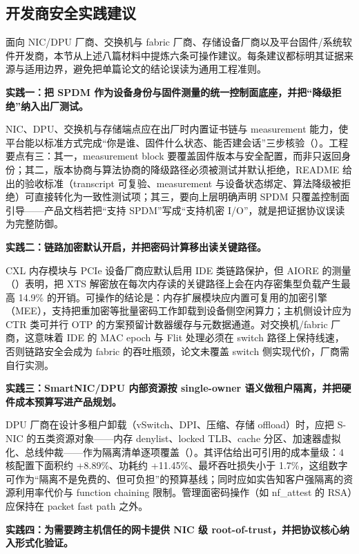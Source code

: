 \documentclass[11pt]{ctexart}
\begin{document}
\subsection{开发商安全实践建议}
面向 NIC/DPU 厂商、交换机与 fabric 厂商、存储设备厂商以及平台固件/系统软件开发商，本节从上述八篇材料中提炼六条可操作建议。每条建议都标明其证据来源与适用边界，避免把单篇论文的结论误读为通用工程准则。\par
\noindent\textbf{实践一：把 SPDM 作为设备身份与固件测量的统一控制面底座，并把“降级拒绝”纳入出厂测试。}\par
NIC、DPU、交换机与存储端点应在出厂时内置证书链与 measurement 能力，使平台能以标准方式完成“你是谁、固件什么状态、能否建会话”三步核验（\cite{dmtf_spdm_2025}）。工程要点有三：其一，measurement block 要覆盖固件版本与安全配置，而非只返回身份；其二，版本协商与算法协商的降级路径必须被测试并默认拒绝，README 给出的验收标准（transcript 可复验、measurement 与设备状态绑定、算法降级被拒绝）可直接转化为一致性测试项；其三，要向上层明确声明 SPDM 只覆盖控制面引导——产品文档若把“支持 SPDM”写成“支持机密 I/O”，就是把证据协议误读为完整防御。\par
\noindent\textbf{实践二：链路加密默认开启，并把密码计算移出读关键路径。}\par
CXL 内存模块与 PCIe 设备厂商应默认启用 IDE 类链路保护，但 AIORE 的测量（\cite{li2025aiore}）表明，把 XTS 解密放在每次内存读的关键路径上会在内存密集型负载产生最高 14.9\% 的开销。可操作的结论是：内存扩展模块应内置可复用的加密引擎（MEE），支持把重加密等批量密码工作卸载到设备侧空闲算力；主机侧设计应为 CTR 类可并行 OTP 的方案预留计数器缓存与元数据通道。对交换机/fabric 厂商，这意味着 IDE 的 MAC epoch 与 Flit 处理必须在 switch 路径上保持线速，否则链路安全会成为 fabric 的吞吐瓶颈，论文未覆盖 switch 侧实现代价，厂商需自行实测。\par
\noindent\textbf{实践三：SmartNIC/DPU 内部资源按 single-owner 语义做租户隔离，并把硬件成本预算写进产品规划。}\par
DPU 厂商在设计多租户卸载（vSwitch、DPI、压缩、存储 offload）时，应把 S-NIC 的五类资源对象——内存 denylist、locked TLB、cache 分区、加速器虚拟化、总线仲裁——作为隔离清单逐项覆盖（\cite{zhou2024snic}）。其评估给出可引用的成本量级：4 核配置下面积约 +8.89\%、功耗约 +11.45\%、最坏吞吐损失小于 1.7\%，这组数字可作为“隔离不是免费的、但可负担”的预算基线；同时应如实告知客户强隔离的资源利用率代价与 function chaining 限制。管理面密码操作（如 nf\_attest 的 RSA）应保持在 packet fast path 之外。\par
\noindent\textbf{实践四：为需要跨主机信任的网卡提供 NIC 级 root-of-trust，并把协议核心纳入形式化验证。}\par
\end{document}
